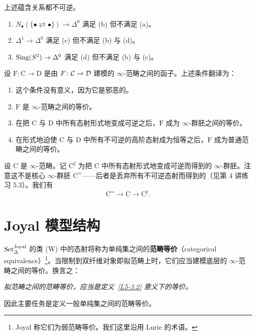 \begin{exercise}\label{L5-3.8}
上述蕴含关系都不可逆。
\begin{enumerate}[label=(\arabic*),leftmargin=2.4em,itemsep=0.1em]
\item $N_{\bullet}(\{\bullet\rightleftarrows\bullet\})\to\Delta^0$ 满足 (b) 但不满足 (a)。
\item $\Delta^1\to\Delta^0$ 满足 (c) 但不满足 (b) 与 (d)。
\item $\operatorname{Sing}(S^2)\to\Delta^0$ 满足 (d) 但不满足 (b) 与 (c)。
\end{enumerate}
\end{exercise}

\begin{remark}\label{L5-3.9}
设 $\mathrm{F}\colon\mathrm{C}\to\mathrm{D}$ 是由 $F\colon\mathcal{C}\to\mathcal{D}$ 建模的 $\infty$-范畴之间的函子。上述条件翻译为：
\begin{enumerate}[label=(\alph*),leftmargin=2.4em,itemsep=0.1em]
\item 这个条件没有意义，因为它是邪恶的。
\item $\mathrm{F}$ 是 $\infty$-范畴之间的等价。
\item 在把 $\mathrm{C}$ 与 $\mathrm{D}$ 中所有态射形式地变成可逆之后，$\mathrm{F}$ 成为 $\infty$-群胚之间的等价。
\item 在形式地迫使 $\mathrm{C}$ 与 $\mathrm{D}$ 中所有不可逆的高阶态射成为恒等之后，$\mathrm{F}$ 成为普通范畴之间的等价。
\end{enumerate}
\end{remark}

\begin{remark}\label{L5-3.10}
设 $\mathrm{C}$ 是 $\infty$-范畴。记 $\mathrm{C}^{\sharp}$ 为把 $\mathrm{C}$ 中所有态射形式地变成可逆而得到的 $\infty$-群胚。注意这不是核心 $\infty$-群胚 $\mathrm{C}^{\simeq}$——后者是丢弃所有不可逆态射而得到的（见第 4 讲练习 5.3）。我们有
\[
\mathrm{C}^{\simeq}\to\mathrm{C}\to\mathrm{C}^{\sharp}.
\]
\end{remark}

\section{Joyal 模型结构}

\nitem\label{L5-4.1} $\operatorname{Set}^{\mathrm{Joyal}}_\Delta$ 的类 (W) 中的态射将称为单纯集之间的\textbf{范畴等价}（categorical equivalence）\footnote{Joyal 称它们为弱范畴等价。我们这里沿用 Lurie 的术语。}。当限制到双纤维对象即拟范畴上时，它们应当建模底层的 $\infty$-范畴之间的等价。换言之：
\begin{center}
\emph{拟范畴之间的范畴等价，应当是定义~\ref{L5-3.2} 意义下的等价。}
\end{center}
因此主要任务是定义一般单纯集之间的范畴等价。

